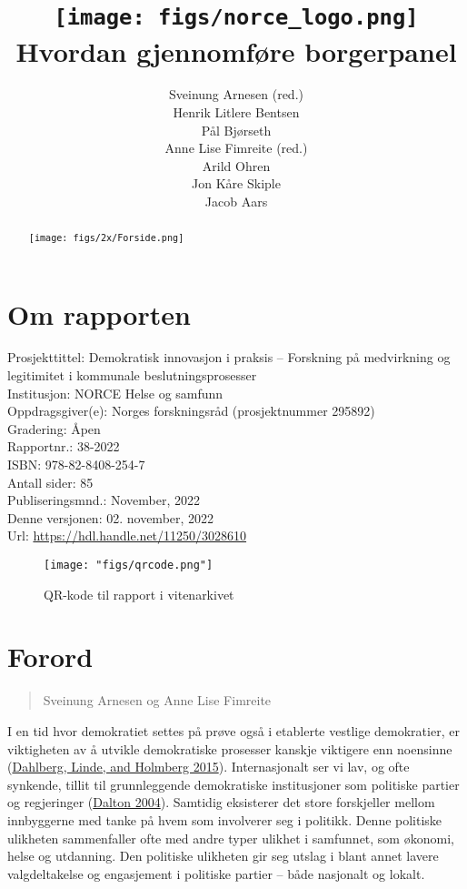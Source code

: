 \documentclass[
  12pt,
  a4paper, 12pt]{article}
\title{\texttt{[image: figs/norce\_logo.png]}\\
\bigskip  
Hvordan gjennomføre borgerpanel}
\author{Sveinung Arnesen (red.)\\
Henrik Litlere Bentsen\\
Pål Bjørseth\\
Anne Lise Fimreite (red.)\\
Arild Ohren\\
Jon Kåre Skiple\\
Jacob Aars}
\date{}
\begin{document}
\maketitle
\begin{abstract}
\texttt{[image: figs/2x/Forside.png]}
\end{abstract}

\newpage
\tableofcontents

\newpage
\listoftables
\listoffigures

\newpage

\hypertarget{om-rapporten}{%
\section{Om rapporten}\label{om-rapporten}}

Prosjekttittel: Demokratisk innovasjon i praksis -- Forskning på medvirkning og legitimitet i kommunale beslutningsprosesser\\
Institusjon: NORCE Helse og samfunn\\
Oppdragsgiver(e): Norges forskningsråd (prosjektnummer 295892)\\
Gradering: Åpen\\
Rapportnr.: 38-2022\\
ISBN: 978-82-8408-254-7\\
Antall sider: 85\\
Publiseringsmnd.: November, 2022\\
Denne versjonen: 02. november, 2022\\
Url: \url{https://hdl.handle.net/11250/3028610}

\begin{figure}
\centering
\texttt{[image: "figs/qrcode.png"]}
\caption{QR-kode til rapport i vitenarkivet}
\end{figure}

\newpage

\hypertarget{forord}{%
\section{Forord}\label{forord}}

\begin{quote}
Sveinung Arnesen og Anne Lise Fimreite
\end{quote}

I en tid hvor demokratiet settes på prøve også i etablerte vestlige demokratier, er viktigheten av å utvikle demokratiske prosesser kanskje viktigere enn noensinne (\protect\hyperlink{ref-dahlberg2015democratic}{Dahlberg, Linde, and Holmberg 2015}). Internasjonalt ser vi lav, og ofte synkende, tillit til grunnleggende demokratiske institusjoner som politiske partier og regjeringer (\protect\hyperlink{ref-dalton2004democratic}{Dalton 2004}). Samtidig eksisterer det store forskjeller mellom innbyggerne med tanke på hvem som involverer seg i politikk. Denne politiske ulikheten sammenfaller ofte med andre typer ulikhet i samfunnet, som økonomi, helse og utdanning. Den politiske ulikheten gir seg utslag i blant annet lavere valgdeltakelse og engasjement i politiske partier -- både nasjonalt og lokalt.
\end{document}
